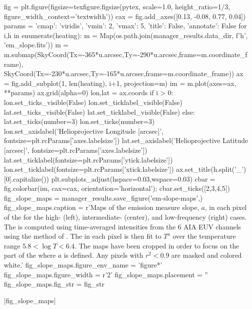 \begin{pycode}
fig = plt.figure(figsize=texfigure.figsize(pytex, scale=1.0, height_ratio=1/3,
                                           figure_width_context='textwidth'))
cax = fig.add_axes([0.13, -0.08, 0.77, 0.04])
params = {'cmap': 'viridis', 'vmin': 2, 'vmax': 5, 'title': False, 'annotate': False}
for i,h in enumerate(heating):
    m = Map(os.path.join(manager_results.data_dir, f'{h}', 'em_slope.fits'))
    m = m.submap(SkyCoord(Tx=-365*u.arcsec,Ty=-290*u.arcsec,frame=m.coordinate_frame),
                 SkyCoord(Tx=-230*u.arcsec,Ty=-165*u.arcsec,frame=m.coordinate_frame))
    ax = fig.add_subplot(1, len(heating), i+1, projection=m)
    im = m.plot(axes=ax, **params)
    ax.grid(alpha=0)
    lon,lat = ax.coords
    if i > 0:
        lon.set_ticks_visible(False)
        lon.set_ticklabel_visible(False)
        lat.set_ticks_visible(False)
        lat.set_ticklabel_visible(False)
    else:
        lat.set_ticks(number=3)
        lon.set_ticks(number=3)
        lon.set_axislabel('Helioprojective Longitude [arcsec]',
                          fontsize=plt.rcParams['axes.labelsize'])
        lat.set_axislabel('Helioprojective Latitude [arcsec]',
                          fontsize=plt.rcParams['axes.labelsize'])
        lat.set_ticklabel(fontsize=plt.rcParams['ytick.labelsize'])
        lon.set_ticklabel(fontsize=plt.rcParams['xtick.labelsize'])
    ax.set_title(h.split('_')[0].capitalize())
plt.subplots_adjust(hspace=0.03,wspace=0.03)
cbar = fig.colorbar(im, cax=cax, orientation='horizontal');
cbar.set_ticks([2,3,4,5])
fig_slope_maps = manager_results.save_figure('em-slope-maps',)
fig_slope_maps.caption = r'Maps of the emission measure slope, $a$, in each pixel of the \AR{} for the high- (left), intermediate- (center), and low-frequency (right) cases. The \dem{} is computed using time-averaged intensities from the 6 AIA EUV channels using the method of \citet{hannah_differential_2012}. The \dem{} in each pixel is then fit to $T^a$ over the temperature range $5.8<\log{T}<6.4$. The maps have been cropped in order to focus on the part of the \AR{} where $a$ is defined. Any pixels with $r^2<0.9$ are masked and colored white.'
fig_slope_maps.figure_env_name = 'figure*'
fig_slope_maps.figure_width = r'2\columnwidth'
fig_slope_maps.placement = ''
fig_slope_maps.fig_str = fig_str
\end{pycode}
|fig_slope_maps|

